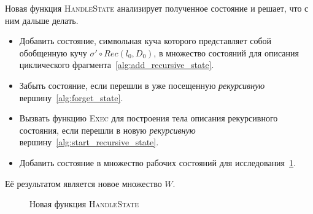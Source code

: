 Новая функция \textsc{HandleState} анализирует полученное состояние и решает, что с ним дальше делать.
\begin{itemize}
    \item Добавить состояние, символьная куча которого представляет собой обобщенную кучу $\sigma' \circ Rec(l_0,D_0)$, в множество состояний для описания циклического фрагмента~\ref{alg:add_recursive_state}.
    \item Забыть состояние, если перешли в уже посещенную \emph{рекурсивную} вершину~\ref{alg:forget_state}.
    \item Вызвать функцию \textsc{Exec} для построения тела описания рекурсивного состояния, если перешли в новую \emph{рекурсивную} вершину~\ref{alg:start_recursive_state}.
    \item Добавить состояние в множество рабочих состояний для исследования~\ref{alg:call_join_from_handle}.
\end{itemize}
Её результатом является новое множество $W$.

\begin{figure}
\begin{algorithm2e}[H]
    \caption{Новая функция \textsc{HandleState}}
    \label{algorithm:execute_instruction}
    \small
    \SetAlgoSkip{}

     {

        \Return {}\label{alg:call_join_from_handle}\;
    }
\end{algorithm2e}
\end{figure}

